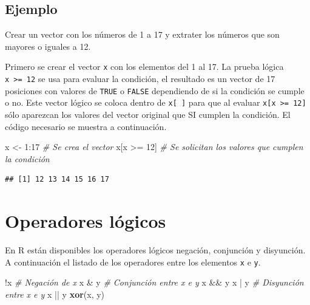 \documentclass[10pt,]{krantz}
\makeatletter
\newenvironment{Shaded}{\begin{snugshade}}{\end{snugshade}}
\newcommand{\KeywordTok}[1]{\textcolor[rgb]{0.13,0.29,0.53}{\textbf{{#1}}}}
\newcommand{\DecValTok}[1]{\textcolor[rgb]{0.00,0.00,0.81}{{#1}}}
\newcommand{\StringTok}[1]{\textcolor[rgb]{0.31,0.60,0.02}{{#1}}}
\newcommand{\CommentTok}[1]{\textcolor[rgb]{0.56,0.35,0.01}{\textit{{#1}}}}
\newcommand{\NormalTok}[1]{{#1}}
\let\proglang=\textsf
\newenvironment{kframe}{%
\medskip{}
\setlength{\fboxsep}{.8em}
 \def\at@end@of@kframe{}%
 \ifinner\ifhmode%
  \def\at@end@of@kframe{\end{minipage}}%
  \begin{minipage}{\columnwidth}%
 \fi\fi%
 \def\FrameCommand##1{\hskip\@totalleftmargin \hskip-\fboxsep
 \colorbox{shadecolor}{##1}\hskip-\fboxsep
     \hskip-\linewidth \hskip-\@totalleftmargin \hskip\columnwidth}%
 \MakeFramed {\advance\hsize-\width
   \@totalleftmargin\z@ \linewidth\hsize
   \@setminipage}}%
 {\par\unskip\endMakeFramed%
 \at@end@of@kframe}
\renewenvironment{Shaded}{\begin{kframe}}{\end{kframe}}
\makeatother
\begin{document}
\subsection*{Ejemplo}\label{ejemplo-1}


Crear un vector con los números de 1 a 17 y extrater los números que son
mayores o iguales a 12.

Primero se crear el vector \texttt{x} con los elementos del 1 al 17. La
prueba lógica \texttt{x\ \textgreater{}=\ 12} se usa para evaluar la
condición, el resultado es un vector de 17 posiciones con valores de
\texttt{TRUE} o \texttt{FALSE} dependiendo de si la condición se cumple
o no. Este vector lógico se coloca dentro de \texttt{x{[}\ {]}} para que
al evaluar \texttt{x{[}x\ \textgreater{}=\ 12{]}} sólo aparezcan los
valores del vector original que SI cumplen la condición. El código
necesario se muestra a continuación.

\begin{Shaded}
\begin{Highlighting}[]
\NormalTok{x <-}\StringTok{ }\DecValTok{1}\NormalTok{:}\DecValTok{17}  \CommentTok{# Se crea el vector}
\NormalTok{x[x >=}\StringTok{ }\DecValTok{12}\NormalTok{]  }\CommentTok{# Se solicitan los valores que cumplen la condición}
\end{Highlighting}
\end{Shaded}

\begin{verbatim}
## [1] 12 13 14 15 16 17
\end{verbatim}

\section{\texorpdfstring{Operadores lógicos
}{Operadores lógicos }}\label{operadores-logicos}

En \proglang{R} están disponibles los operadores lógicos negación,
conjunción y disyunción. A continuación el listado de los operadores
entre los elementos \texttt{x} e \texttt{y}.

\begin{Shaded}
\begin{Highlighting}[]
\NormalTok{!x  }\CommentTok{# Negación de x}
\NormalTok{x &}\StringTok{ }\NormalTok{y  }\CommentTok{# Conjunción entre x e y}
\NormalTok{x &&}\StringTok{ }\NormalTok{y}
\NormalTok{x |}\StringTok{ }\NormalTok{y  }\CommentTok{# Disyunción entre x e y}
\NormalTok{x ||}\StringTok{ }\NormalTok{y}
\KeywordTok{xor}\NormalTok{(x, y)}
\end{Highlighting}
\end{Shaded}
\end{document}
